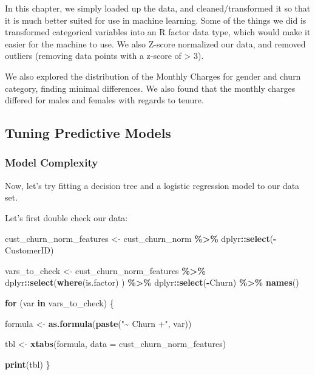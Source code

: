 \documentclass[
]{article}
\newenvironment{Shaded}{\begin{snugshade}}{\end{snugshade}}
\newcommand{\AttributeTok}[1]{\textcolor[rgb]{0.13,0.29,0.53}{#1}}
\newcommand{\ControlFlowTok}[1]{\textcolor[rgb]{0.13,0.29,0.53}{\textbf{#1}}}
\newcommand{\FunctionTok}[1]{\textcolor[rgb]{0.13,0.29,0.53}{\textbf{#1}}}
\newcommand{\NormalTok}[1]{#1}
\newcommand{\OtherTok}[1]{\textcolor[rgb]{0.56,0.35,0.01}{#1}}
\newcommand{\SpecialCharTok}[1]{\textcolor[rgb]{0.81,0.36,0.00}{\textbf{#1}}}
\newcommand{\StringTok}[1]{\textcolor[rgb]{0.31,0.60,0.02}{#1}}
\begin{document}
In this chapter, we simply loaded up the data, and cleaned/transformed
it so that it is much better suited for use in machine learning. Some of
the things we did is transformed categorical variables into an R factor
data type, which would make it easier for the machine to use. We also
Z-score normalized our data, and removed outliers (removing data points
with a z-score of \textgreater{} 3).

We also explored the distribution of the Monthly Charges for gender and
churn category, finding minimal differences. We also found that the
monthly charges differed for males and females with regards to tenure.

\subsection{Tuning Predictive Models}\label{tuning-predictive-models}

\subsubsection{Model Complexity}\label{model-complexity}

Now, let's try fitting a decision tree and a logistic regression model
to our data set.

Let's first double check our data:

\begin{Shaded}
\begin{Highlighting}[]
\NormalTok{cust\_churn\_norm\_features }\OtherTok{\textless{}{-}}\NormalTok{ cust\_churn\_norm }\SpecialCharTok{\%\textgreater{}\%}\NormalTok{ dplyr}\SpecialCharTok{::}\FunctionTok{select}\NormalTok{(}\SpecialCharTok{{-}}\NormalTok{CustomerID)}

\NormalTok{vars\_to\_check }\OtherTok{\textless{}{-}}\NormalTok{ cust\_churn\_norm\_features }\SpecialCharTok{\%\textgreater{}\%} 
\NormalTok{  dplyr}\SpecialCharTok{::}\FunctionTok{select}\NormalTok{(}\FunctionTok{where}\NormalTok{(is.factor) ) }\SpecialCharTok{\%\textgreater{}\%}
\NormalTok{  dplyr}\SpecialCharTok{::}\FunctionTok{select}\NormalTok{(}\SpecialCharTok{{-}}\NormalTok{Churn) }\SpecialCharTok{\%\textgreater{}\%} \FunctionTok{names}\NormalTok{()}

\ControlFlowTok{for}\NormalTok{ (var }\ControlFlowTok{in}\NormalTok{ vars\_to\_check) \{}
  
\NormalTok{  formula }\OtherTok{\textless{}{-}} \FunctionTok{as.formula}\NormalTok{(}\FunctionTok{paste}\NormalTok{(}\StringTok{"\textasciitilde{} Churn +"}\NormalTok{, var))}
  
\NormalTok{  tbl }\OtherTok{\textless{}{-}} \FunctionTok{xtabs}\NormalTok{(formula, }\AttributeTok{data =}\NormalTok{ cust\_churn\_norm\_features)}
  
  \FunctionTok{print}\NormalTok{(tbl)}
\NormalTok{\}}
\end{Highlighting}
\end{Shaded}
\end{document}
